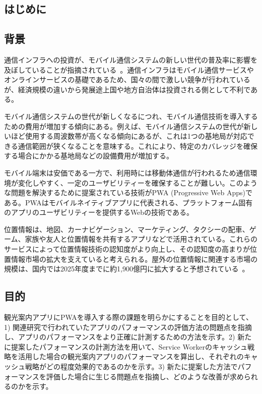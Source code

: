 \maketitle
\begin{multicols*}{2}

\section{はじめに}
\subsection{背景}
通信インフラへの投資が、モバイル通信システムの新しい世代の普及率に影響を及ぼしていることが指摘されている~\cite{Forge2020FormingA5GStrategyForDevelopingCountries}。通信インフラはモバイル通信サービスやオンラインサービスの基礎であるため、国々の間で激しい競争が行われているが、経済規模の違いから発展途上国や地方自治体は投資される側として不利である。

モバイル通信システムの世代が新しくなるにつれ、モバイル通信技術を導入するための費用が増加する傾向にある。例えば、モバイル通信システムの世代が新しいほど使用する周波数帯が高くなる傾向にあるが、これは1つの基地局が対応できる通信範囲が狭くなることを意味する。これにより、特定のカバレッジを確保する場合にかかる基地局などの設備費用が増加する。

モバイル端末は安価である一方で、利用時には移動体通信が行われるため通信環境が変化しやすく、一定のユーザビリティーを確保することが難しい。このような問題を解決するために提案されている技術がPWA (Progressive Web Apps)である。PWAはモバイルネイティブアプリに代表される、プラットフォーム固有のアプリのユーザビリティーを提供するWebの技術である。

位置情報は、地図、カーナビゲーション、マーケティング、タクシーの配車、ゲーム、家族や友人と位置情報を共有するアプリなどで活用されている。これらのサービスによって位置情報技術の認知度がより向上し、その認知度の高まりが位置情報市場の拡大を支えていると考えられる。屋外の位置情報に関連する市場の規模は、国内では2025年度までに約1,900億円に拡大すると予想されている~\cite{MIC2023InformationStatistics}。
\subsection{目的}
観光案内アプリにPWAを導入する際の課題を明らかにすることを目的として、1) 関連研究で行われていたアプリのパフォーマンスの評価方法の問題点を指摘し、アプリのパフォーマンスをより正確に計測するための方法を示す。2) 新たに提案したパフォーマンスの計測方法を用いて、Service Workerのキャッシュ戦略を活用した場合の観光案内アプリのパフォーマンスを算出し、それぞれのキャッシュ戦略がどの程度効果的であるのかを示す。3) 新たに提案した方法でパフォーマンスを評価した場合に生じる問題点を指摘し、どのような改善が求められるのかを示す。

\end{multicols*}
